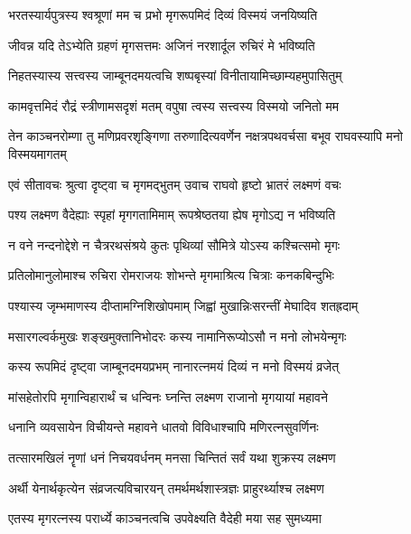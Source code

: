 \twolineshloka
{भरतस्यार्यपुत्रस्य श्वश्रूणां मम च प्रभो}
{मृगरूपमिदं दिव्यं विस्मयं जनयिष्यति} %

\twolineshloka
{जीवन्न यदि तेऽभ्येति ग्रहणं मृगसत्तमः}
{अजिनं नरशार्दूल रुचिरं मे भविष्यति} %

\twolineshloka
{निहतस्यास्य सत्त्वस्य जाम्बूनदमयत्वचि}
{शष्पबृस्यां विनीतायामिच्छाम्यहमुपासितुम्} %

\twolineshloka
{कामवृत्तमिदं रौद्रं स्त्रीणामसदृशं मतम्}
{वपुषा त्वस्य सत्त्वस्य विस्मयो जनितो मम} %

\threelineshloka
{तेन काञ्चनरोम्णा तु मणिप्रवरशृङ्गिणा}
{तरुणादित्यवर्णेन नक्षत्रपथवर्चसा}
{बभूव राघवस्यापि मनो विस्मयमागतम्} %

\twolineshloka
{एवं सीतावचः श्रुत्वा दृष्ट्वा च मृगमद्भुतम्}
{उवाच राघवो हृष्टो भ्रातरं लक्ष्मणं वचः} %

\twolineshloka
{पश्य लक्ष्मण वैदेह्याः स्पृहां मृगगतामिमाम्}
{रूपश्रेष्ठतया ह्येष मृगोऽद्य न भविष्यति} %

\twolineshloka
{न वने नन्दनोद्देशे न चैत्ररथसंश्रये}
{कुतः पृथिव्यां सौमित्रे योऽस्य कश्चित्समो मृगः} %

\twolineshloka
{प्रतिलोमानुलोमाश्च रुचिरा रोमराजयः}
{शोभन्ते मृगमाश्रित्य चित्राः कनकबिन्दुभिः} %

\twolineshloka
{पश्यास्य जृम्भमाणस्य दीप्तामग्निशिखोपमाम्}
{जिह्वां मुखान्निःसरन्तीं मेघादिव शतह्रदाम्} %

\twolineshloka
{मसारगल्वर्कमुखः शङ्खमुक्तानिभोदरः}
{कस्य नामानिरूप्योऽसौ न मनो लोभयेन्मृगः} %

\twolineshloka
{कस्य रूपमिदं दृष्ट्वा जाम्बूनदमयप्रभम्}
{नानारत्नमयं दिव्यं न मनो विस्मयं व्रजेत्} %

\twolineshloka
{मांसहेतोरपि मृगान्विहारार्थं च धन्विनः}
{घ्नन्ति लक्ष्मण राजानो मृगयायां महावने} %

\twolineshloka
{धनानि व्यवसायेन विचीयन्ते महावने}
{धातवो विविधाश्चापि मणिरत्नसुवर्णिनः} %

\twolineshloka
{तत्सारमखिलं नॄणां धनं निचयवर्धनम्}
{मनसा चिन्तितं सर्वं यथा शुक्रस्य लक्ष्मण} %

\twolineshloka
{अर्थी येनार्थकृत्येन संव्रजत्यविचारयन्}
{तमर्थमर्थशास्त्रज्ञः प्राहुरर्थ्याश्च लक्ष्मण} %

\twolineshloka
{एतस्य मृगरत्नस्य परार्ध्ये काञ्चनत्वचि}
{उपवेक्ष्यति वैदेही मया सह सुमध्यमा} %

